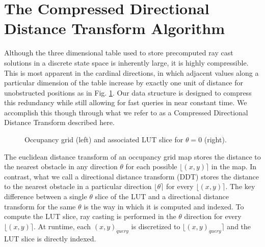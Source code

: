 \documentclass[letterpaper, 10 pt, conference]{ieeeconf}  %
\newcommand{\gridScale}{1.25}
\begin{document}
\section{The Compressed Directional Distance Transform Algorithm}

Although the three dimensional table used to store precomputed ray cast solutions in a discrete state space is inherently large, it is highly compressible. This is most apparent in the cardinal directions, in which adjacent values along a particular dimension of the table increase by exactly one unit of distance for unobstructed positions as in Fig. \ref{cardinal_example}. Our data structure is designed to compress this redundancy while still allowing for fast queries in near constant time. We accomplish this though through what we refer to as a Compressed Directional Distance Transform described here.

\begin{figure}[h]
\begin{center}
\end{center}
\caption{Occupancy grid (left) and associated LUT slice for $\theta=0$ (right).}
\label{cardinal_example}
\end{figure}

The euclidean distance transform of an occupancy grid map stores the distance to the nearest obstacle in any direction $\theta$ for each possible $\lfloor(x,y)\rceil$ in the map. In contrast, what we call a directional distance transform (DDT) stores the distance to the nearest obstacle in a particular direction $\lfloor\theta\rceil$ for every $\lfloor(x,y)\rceil$. The key difference between a single $\theta$ slice of the LUT and a directional distance transform for the same $\theta$ is the way in which it is computed and indexed. To compute the LUT slice, ray casting is performed in the $\theta$ direction for every $\lfloor(x,y)\rceil$. At runtime, each $(x,y)_{query}$ is discretized to $\lfloor(x,y)_{query}\rceil$ and the LUT slice is directly indexed.
\end{document}
